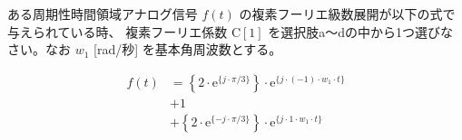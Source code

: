 ある周期性時間領域アナログ信号 $f(t)$ の複素フーリエ級数展開が以下の式で与えられている時、
複素フーリエ係数 $\textrm{C}[1]$ を選択肢a〜dの中から1つ選びなさい。なお $w_1$ [rad/秒] を基本角周波数とする。

\begin{align*}
f(t) 
&= \left \{ 2 \cdot \textrm{e}^{\{ j \cdot \pi/3 \}} \right \} \cdot \textrm{e}^{\{ j \cdot (-1) \cdot w_1 \cdot t \}} \\
&+ 1 \\
&+ \left \{ 2 \cdot \textrm{e}^{\{-j \cdot \pi/3 \}} \right \} \cdot \textrm{e}^{\{ j \cdot    1 \cdot w_1 \cdot t \}} 
\end{align*}
